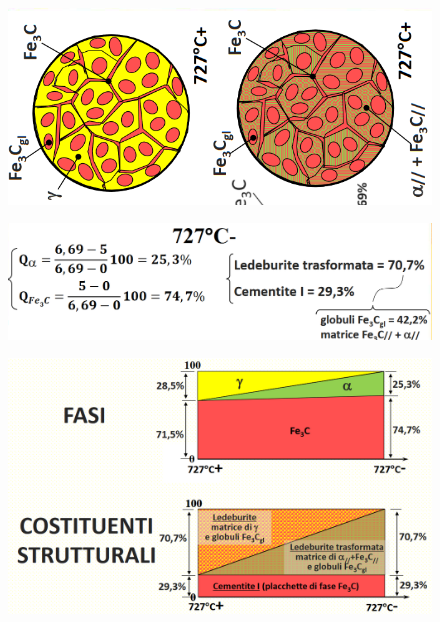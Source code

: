 \documentclass{article}
\begin{document}
{\begin{figure}[h!]
            \end{figure}
             \begin{figure}[h!]
                \centering
                \includegraphics[width=.7\linewidth]{L14 - C = 5 Strutture da 727+ a 727-.png}
            \end{figure}
             \begin{figure}[h!]
                \centering
                \includegraphics[width=.8\linewidth]{L14 - C = 5 Calcolo a 727-.png}
            \end{figure}
             \begin{figure}[h!]
                \centering
                \includegraphics[width=.7\linewidth]{L14 - C = 5 Diagrammi di Fasi e Costituenti da 727+ a 727-.png}
            \end{figure}

}
\end{document}
